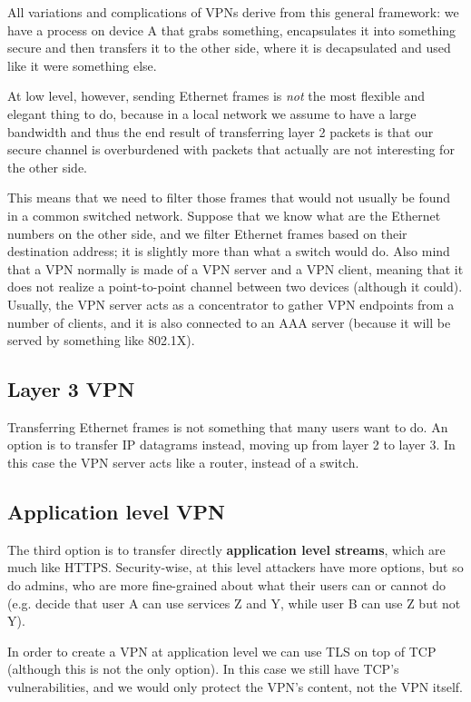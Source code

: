 All variations and complications of VPNs derive from this general framework: we have a process on device A that grabs something, encapsulates it into something secure and then transfers it to the other side, where it is decapsulated and used like it were something else.
 
At low level, however, sending Ethernet frames is \textit{not} the most flexible and elegant thing to do, because in a local network we assume to have a large bandwidth and thus the end result of transferring layer 2 packets is that our secure channel is overburdened with packets that actually are not interesting for the other side.

This means that we need to filter those frames that would not usually be found in a common switched network. Suppose that we know what are the Ethernet numbers on the other side, and we filter Ethernet frames based on their destination address; it is slightly more than what a switch would do. Also mind that a VPN normally is made of a VPN server and a VPN client, meaning that it does not realize a point-to-point channel between two devices (although it could). Usually, the VPN server acts as a concentrator to gather VPN endpoints from a number of clients, and it is also connected to an AAA server (because it will be served by something like 802.1X).


\subsection{Layer 3 VPN}
Transferring Ethernet frames is not something that many users want to do. An option is to transfer IP datagrams instead, moving up from layer 2 to layer 3. In this case the VPN server acts like a router, instead of a switch.


\subsection{Application level VPN}
The third option  is to transfer directly \textbf{application level streams}, which are much like HTTPS. Security-wise, at this level attackers have more options, but so do admins, who are more fine-grained about what their users can or cannot do (e.g. decide that user A can use services Z and Y, while user B can use Z but not Y).

In order to create a VPN at application level we can use TLS on top of TCP (although this is not the only option). In this case we still have TCP’s vulnerabilities, and we would only protect the VPN’s content, not the VPN itself.
 
